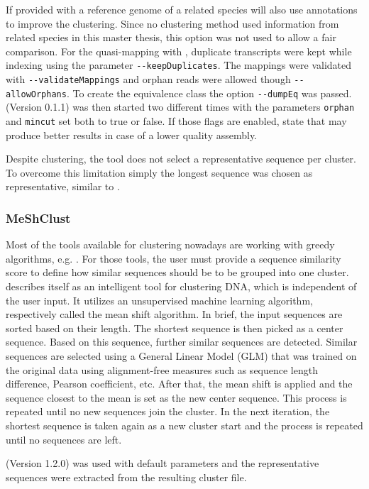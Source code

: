 \documentclass[12pt,a4paper,english]{article}
\begin{document}
	If provided with a reference genome of a related species \grouper will also use annotations to improve the clustering. Since no clustering method used information from related species in this master thesis, this option was not used to allow a fair comparison.
	For the quasi-mapping with \salmon, duplicate transcripts were kept while indexing using the parameter \texttt{-{}-keepDuplicates}. The mappings were validated with \texttt{-{}-validateMappings} and orphan reads were allowed though \texttt{-{}-allowOrphans}. To create the equivalence class the option \texttt{-{}-dumpEq} was passed.
	\grouper (Version 0.1.1) was then started two different times with the parameters \texttt{orphan} and \texttt{mincut} set both to true or false. If those flags are enabled, \citeauthor{Grouper:18} state that \grouper may produce better results in case of a lower quality assembly.
	
	Despite clustering, the tool does not select a representative sequence per cluster. To overcome this limitation simply the longest sequence was chosen as representative, similar to \cdhit.

\subsubsection*{MeShClust}
    Most of the tools available for clustering nowadays are working with greedy algorithms, e.g. \cdhit. For those tools, the user must provide a sequence similarity score to define how similar sequences should be to be grouped into one cluster. \mclust \citep{meshclust:18} describes itself as an intelligent tool for clustering DNA, which is independent of the user input. It utilizes an unsupervised machine learning algorithm, respectively called the mean shift algorithm.
	In brief, the input sequences are sorted based on their length. The shortest sequence is then picked as a center sequence. Based on this sequence, further similar sequences are detected. Similar sequences are selected using a General Linear Model (GLM) that was trained on the original data using alignment-free measures such as sequence length difference, Pearson coefficient, etc. After that, the mean shift is applied and the sequence closest to the mean is set as the new center sequence. This process is repeated until no new sequences join the cluster. In the next iteration, the shortest sequence is taken again as a new cluster start and the process is repeated until no sequences are left.

	\mclust (Version 1.2.0) was used with default parameters and the representative sequences were extracted from the resulting cluster file.
\end{document}
